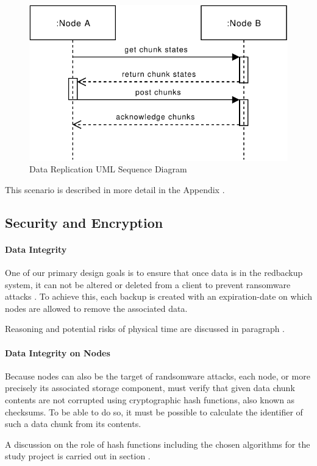 \begin{figure}[h]
    \centering
    \includegraphics[width=0.6\linewidth]{resources/data_replication.pdf}
    \caption{Data Replication UML Sequence Diagram}
\end{figure}

This scenario is described in more detail in the Appendix .

\subsection{Security and Encryption}\label{sec:security-and-encryption}
\paragraph{Data Integrity} One of our primary design goals is to ensure that once data is in the redbackup system, it can not be altered or deleted from a \gls{client} to prevent ransomware attacks \cite{young-cryptovirology}. To achieve this, each backup is created with an \gls{expiration-date} on which \glspl{node} are allowed to remove the associated data. 

Reasoning and potential risks of physical time are discussed in paragraph .

\paragraph{Data Integrity on Nodes} Because \glspl{node} can also be the target of randsomware attacks, each \gls{node}, or more precisely its associated \gls{storage} component, must verify that given data \gls{chunk} contents are not corrupted using cryptographic hash functions, also known as checksums. To be able to do so, it must be possible to calculate the identifier of such a data \gls{chunk} from its contents.

A discussion on the role of hash functions including the chosen algorithms for the study project is carried out in section .


